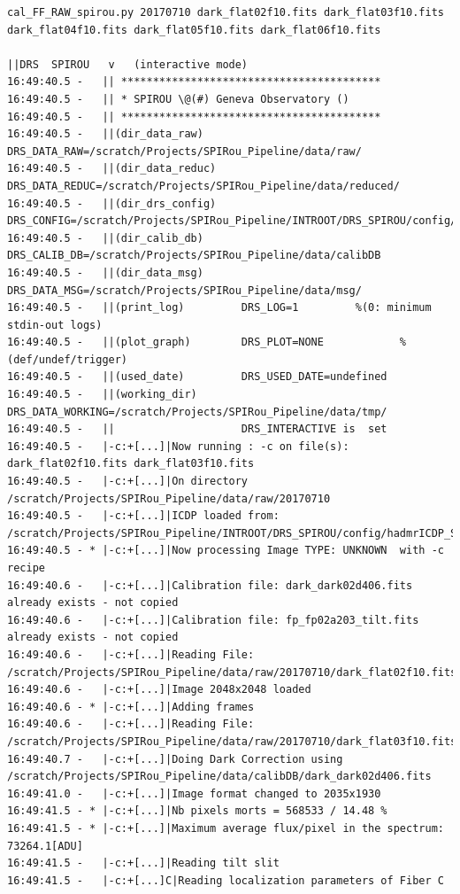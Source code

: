\begin{lstlisting}[style=text]
cal_FF_RAW_spirou.py 20170710 dark_flat02f10.fits dark_flat03f10.fits
dark_flat04f10.fits dark_flat05f10.fits dark_flat06f10.fits

||DRS  SPIROU   v   (interactive mode)
16:49:40.5 -   || *****************************************
16:49:40.5 -   || * SPIROU \@(#) Geneva Observatory ()
16:49:40.5 -   || *****************************************
16:49:40.5 -   ||(dir_data_raw)      DRS_DATA_RAW=/scratch/Projects/SPIRou_Pipeline/data/raw/
16:49:40.5 -   ||(dir_data_reduc)    DRS_DATA_REDUC=/scratch/Projects/SPIRou_Pipeline/data/reduced/
16:49:40.5 -   ||(dir_drs_config)    DRS_CONFIG=/scratch/Projects/SPIRou_Pipeline/INTROOT/DRS_SPIROU/config/
16:49:40.5 -   ||(dir_calib_db)      DRS_CALIB_DB=/scratch/Projects/SPIRou_Pipeline/data/calibDB
16:49:40.5 -   ||(dir_data_msg)      DRS_DATA_MSG=/scratch/Projects/SPIRou_Pipeline/data/msg/
16:49:40.5 -   ||(print_log)         DRS_LOG=1         %(0: minimum stdin-out logs)
16:49:40.5 -   ||(plot_graph)        DRS_PLOT=NONE            %(def/undef/trigger)
16:49:40.5 -   ||(used_date)         DRS_USED_DATE=undefined
16:49:40.5 -   ||(working_dir)       DRS_DATA_WORKING=/scratch/Projects/SPIRou_Pipeline/data/tmp/
16:49:40.5 -   ||                    DRS_INTERACTIVE is  set
16:49:40.5 -   |-c:+[...]|Now running : -c on file(s):  dark_flat02f10.fits dark_flat03f10.fits
16:49:40.5 -   |-c:+[...]|On directory /scratch/Projects/SPIRou_Pipeline/data/raw/20170710
16:49:40.5 -   |-c:+[...]|ICDP loaded from: /scratch/Projects/SPIRou_Pipeline/INTROOT/DRS_SPIROU/config/hadmrICDP_SPIROU.py
16:49:40.5 - * |-c:+[...]|Now processing Image TYPE: UNKNOWN  with -c recipe
16:49:40.6 -   |-c:+[...]|Calibration file: dark_dark02d406.fits already exists - not copied
16:49:40.6 -   |-c:+[...]|Calibration file: fp_fp02a203_tilt.fits already exists - not copied
16:49:40.6 -   |-c:+[...]|Reading File: /scratch/Projects/SPIRou_Pipeline/data/raw/20170710/dark_flat02f10.fits
16:49:40.6 -   |-c:+[...]|Image 2048x2048 loaded
16:49:40.6 - * |-c:+[...]|Adding frames
16:49:40.6 -   |-c:+[...]|Reading File: /scratch/Projects/SPIRou_Pipeline/data/raw/20170710/dark_flat03f10.fits
16:49:40.7 -   |-c:+[...]|Doing Dark Correction using /scratch/Projects/SPIRou_Pipeline/data/calibDB/dark_dark02d406.fits
16:49:41.0 -   |-c:+[...]|Image format changed to 2035x1930
16:49:41.5 - * |-c:+[...]|Nb pixels morts = 568533 / 14.48 %
16:49:41.5 - * |-c:+[...]|Maximum average flux/pixel in the spectrum: 73264.1[ADU]
16:49:41.5 -   |-c:+[...]|Reading tilt slit 
16:49:41.5 -   |-c:+[...]C|Reading localization parameters of Fiber C

\end{lstlisting}
